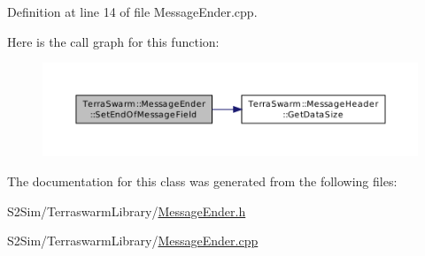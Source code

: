Definition at line 14 of file Message\-Ender.\-cpp.



Here is the call graph for this function\-:\nopagebreak
\begin{figure}[H]
\begin{center}
\leavevmode
\includegraphics[width=350pt]{class_terra_swarm_1_1_message_ender_af69030fc95ad65634ce03e0edb5f3bdd_cgraph}
\end{center}
\end{figure}




The documentation for this class was generated from the following files\-:\begin{DoxyCompactItemize}
\item 
S2\-Sim/\-Terraswarm\-Library/\hyperlink{_message_ender_8h}{Message\-Ender.\-h}\item 
S2\-Sim/\-Terraswarm\-Library/\hyperlink{_message_ender_8cpp}{Message\-Ender.\-cpp}\end{DoxyCompactItemize}
